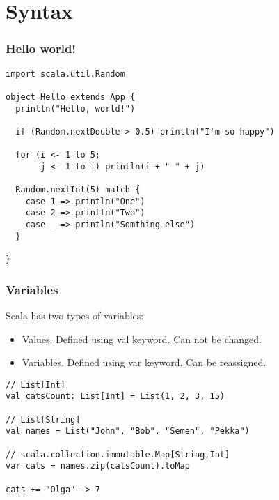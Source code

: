 \section{Syntax}

\begin{frame}[fragile]
\frametitle{Hello world!}

\begin{lstlisting}
import scala.util.Random

object Hello extends App {
  println("Hello, world!")

  if (Random.nextDouble > 0.5) println("I'm so happy")

  for (i <- 1 to 5;
       j <- 1 to i) println(i + " " + j)

  Random.nextInt(5) match {
    case 1 => println("One")
    case 2 => println("Two")
    case _ => println("Somthing else")
  }

}
\end{lstlisting}

\end{frame}

\begin{frame}[fragile]
\frametitle{Variables}
Scala has two types of variables:
\begin{itemize}
  \item Values. Defined using val keyword. Can not be changed.
  \item Variables. Defined using var keyword. Can be reassigned.
\end{itemize}

\begin{example}
\begin{lstlisting}
// List[Int]
val catsCount: List[Int] = List(1, 2, 3, 15)

// List[String] 
val names = List("John", "Bob", "Semen", "Pekka")

// scala.collection.immutable.Map[String,Int]
var cats = names.zip(catsCount).toMap

cats += "Olga" -> 7
\end{lstlisting}
\end{example}

\end{frame}

